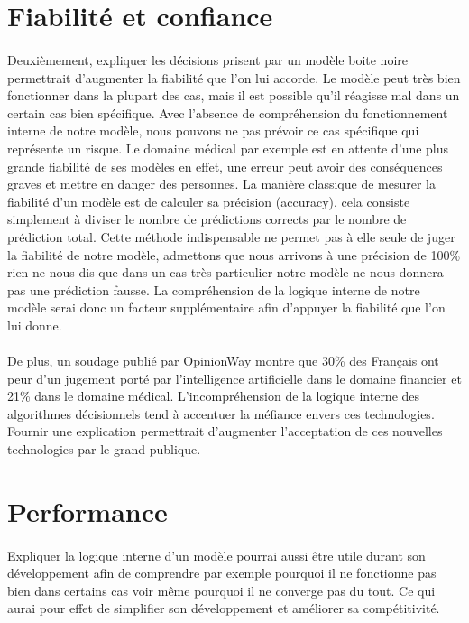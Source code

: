 \section{Fiabilité et confiance}
\paragraph{}Deuxièmement, expliquer les décisions prisent par un modèle boite noire permettrait d'augmenter la fiabilité que l'on lui accorde. Le modèle peut très bien fonctionner dans la plupart des cas, mais il est possible qu'il réagisse mal dans un certain cas bien spécifique. Avec l'absence de compréhension du fonctionnement interne de notre modèle, nous pouvons ne pas prévoir ce cas spécifique qui représente un risque. Le domaine médical par exemple est en attente d'une plus grande fiabilité de ses modèles en effet, une erreur peut avoir des conséquences graves et mettre en danger des personnes. La manière classique de mesurer la fiabilité d'un modèle est de calculer sa précision (accuracy), cela consiste simplement à diviser le nombre de prédictions corrects par le nombre de prédiction total. Cette méthode indispensable ne permet pas à elle seule de juger la fiabilité de notre modèle, admettons que nous arrivons à une précision de 100\% rien ne nous dis que dans un cas très particulier notre modèle ne nous donnera pas une prédiction fausse. La compréhension de la logique interne de notre modèle serai donc un facteur supplémentaire afin d'appuyer la fiabilité que l'on lui donne.
\paragraph{}De plus, un soudage publié par OpinionWay\cite{opinionWay} montre que 30\% des Français ont peur d'un jugement porté par l'intelligence artificielle dans le domaine financier et 21\% dans le domaine médical. L'incompréhension de la logique interne des algorithmes décisionnels tend à accentuer la méfiance envers ces technologies. Fournir une explication permettrait d'augmenter l'acceptation de ces nouvelles technologies par le grand publique.

\section{Performance}
\paragraph{}Expliquer la logique interne d'un modèle pourrai aussi être utile durant son développement afin de comprendre par exemple pourquoi il ne fonctionne pas bien dans certains cas voir même pourquoi il ne converge pas du tout. Ce qui aurai pour effet de simplifier son développement et améliorer sa compétitivité.

